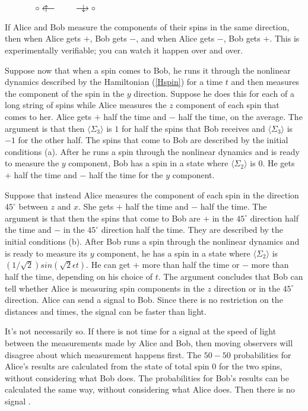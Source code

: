 \documentclass[pra, 12pt, showkeys, eqsecnum]{revtex4}
\begin{document}
\Huge $\; \; \; \; \; \; \; \; \; \; \; \; \; \; \; \; \; \uparrow \hspace{-0.65cm} \circ \longleftarrow \; \; \; \; \; \; \; \; \; 
\longrightarrow \circ \hspace{-0.69cm} \downarrow $  
\bigskip
\normalsize

If Alice and Bob measure the components of their spins in the same direction, then when Alice gets $+$, Bob gets $-$, and when Alice gets $-$, Bob gets $+$. This is experimentally verifiable; you can watch it happen over and over.

Suppose now that when a spin comes to Bob, he runs it through the nonlinear dynamics described by the Hamiltonian (\ref{Hspin}) for a time $t$ and then measures the component of the spin in the $y$ direction. Suppose he does this for each of a long string of spins while Alice measures the $z$ component of each spin that comes to her. Alice gets $+$ half the time and $-$ half the time, on the average. The argument\cite{GisinExample} is that then $\langle \Sigma_3 \rangle $ is $1$ for half the spins that Bob receives and $\langle \Sigma_3 \rangle $ is $-1$ for the other half. The spins that come to Bob are described by the initial conditions (a). After he runs a spin through the nonlinear dynamics and is ready to measure the $y$ component, Bob has a spin in a state where $\langle \Sigma_2 \rangle $ is $0$. He gets $+$ half the time and $-$ half the time for the $y$ component.

Suppose that instead Alice measures the component of each spin in the direction $45^\circ $ between $z$ and $x$. She gets $+$ half the time and $-$ half the time. The argument\cite{GisinExample} is that then the spins that come to Bob are $+$ in the $45^\circ $ direction half the time and $-$ in the $45^\circ $ direction half the time. They are described by the initial conditions (b). After Bob runs a spin through the nonlinear dynamics and is ready to measure its $y$ component, he has a spin in a state where $\langle \Sigma_2 \rangle $ is $(1/\sqrt{2})sin(\sqrt{2}\epsilon t)$. He can get $+$ more than half the time or $-$ more than half the time, depending on his choice of $t$. The argument\cite{GisinExample} concludes that Bob can tell whether Alice is measuring spin components in the $z$ direction or in the $45^\circ $ direction. Alice can send a signal to Bob. Since there is no restriction on the distances and times, the signal can be faster than light.

It's not necessarily so. If there is not time for a signal at the speed of light between the measurements made by Alice and Bob, then moving observers will disagree about which measurement happens first. The $50-50$ probabilities for Alice's results are calculated from the state of total spin $0$ for the two spins, without considering what Bob does. The probabilities for Bob's results can be calculated the same way, without considering what Alice does. Then there is no signal \cite{me64,me71,CzachorDoebner}.
\end{document}
